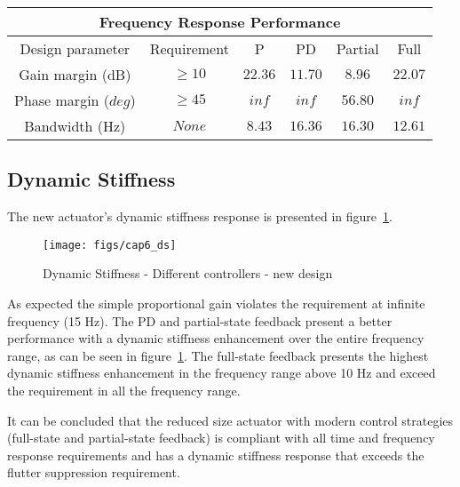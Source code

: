 \begin{table}[H]
    \label{table:newdesign_freq_compliance}
	\centering
	\resizebox{14cm}{!} {
    \begin{tabular}{|c|c|c|c|c|c|}
    \hline
    \multicolumn{6}{|c|}{Frequency Response Performance} \\ \hline
    Design parameter & Requirement & P & PD & Partial & Full \\ \hline
    Gain margin (dB) & $ \geq 10 $ & $22.36$ & $11.70$ & $8.96$ & $22.07$ \\ \hline
    Phase margin ($deg$) & $ \geq 45$ & $inf$ & $inf$ & $56.80$ & $inf$ \\ \hline
    Bandwidth (Hz) & $None$ & $8.43$ & $16.36$ & $16.30$ & $12.61$ \\ \hline
    \end{tabular}
    }

\end{table}

\subsection{Dynamic Stiffness}

The new actuator's dynamic stiffness response is presented in figure~\ref{fig:ds_newdesign}.

\begin{figure}[H]
\centering
\texttt{[image: figs/cap6\_ds]}
\caption{Dynamic Stiffness - Different controllers - new design}
\label{fig:ds_newdesign}
\end{figure}

As expected the simple proportional gain violates the requirement at infinite frequency (15 Hz). The PD and partial-state feedback present a better performance with a dynamic stiffness enhancement over the entire frequency range, as can be seen in figure~\ref{fig:ds_newdesign}. The full-state feedback presents the highest dynamic stiffness enhancement in the frequency range above 10 Hz and exceed the requirement in all the frequency range.

It can be concluded that the reduced size actuator with modern control strategies (full-state and partial-state feedback) is compliant with all time and frequency response requirements and has a dynamic stiffness response that exceeds the flutter suppression requirement.
%

